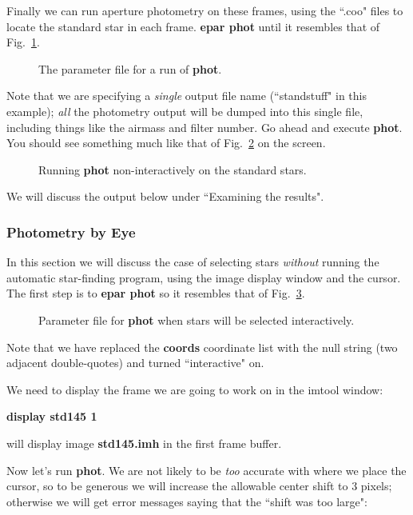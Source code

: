 Finally we can run aperture photometry on these frames, using the 
``.coo" files to locate the standard star in each frame.  {\bf epar
phot} until it resembles that of Fig.~\ref{photphot}.
\begin{figure}
\vspace{3.5in}
\caption{\label{photphot} The parameter file for a run of {\bf phot}.}
\end{figure}
Note that we are specifying a {\it single} output file name
(``standstuff" in this example); {\it all} the photometry output will be
dumped into this single file, including things like the airmass and filter
number.  Go ahead and execute {\bf phot}.
You should see something much like that of Fig.~\ref{photrun} on the
screen.
\begin{figure}
\vspace{5.5in}
\caption{\label{photrun} Running {\bf phot} non-interactively
on the standard stars.}
\end{figure}
We will discuss the output below under ``Examining the results".
 
\subsubsection{Photometry by Eye}
In this section we will discuss the case of selecting stars {\it
without}
running the automatic star-finding program, using the image display
window and the cursor.  The first step is to {\bf epar phot} so it
resembles that of Fig.~\ref{photeye}.
\begin{figure}
\vspace{3.5in}
\caption{\label{photeye} Parameter file for {\bf phot} when stars will
be selected interactively.}
\end{figure}
Note that we have replaced the {\bf coords} coordinate list with the
null string (two adjacent double-quotes) and turned ``interactive" on.
 
We need to display the frame we are going to work on in the imtool
window:
 
\centerline { {\bf display std145 1} }
 
\noindent
will display image {\bf std145.imh} in the first frame buffer.
 
Now let's run {\bf phot}.  We are not likely to be {\it too} accurate
with where we place the cursor, so to be generous we will increase the
allowable center shift to 3 pixels; otherwise we will get error messages
saying that the ``shift was too large":
 
